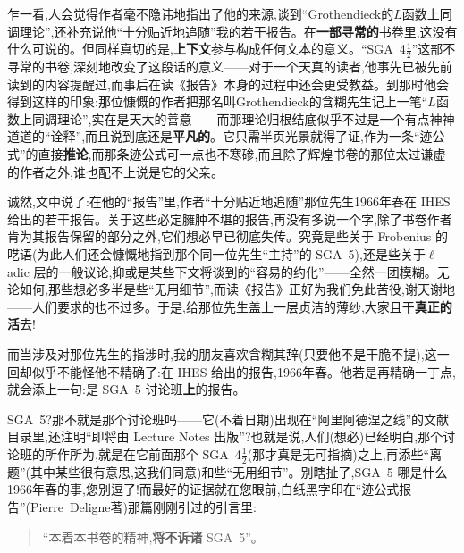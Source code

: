 乍一看,人会觉得作者毫不隐讳地指出了他的来源,谈到“Grothendieck的$L$\dmark{}函数上同调理论”,还补充说他“十分贴近地追随”我的若干报告。在\textbf{一部寻常的}书卷里,这没有什么可说的。但同样真切的是,\textbf{上下文}参与构成任何文本的意义。“SGA~4$\frac{1}{2}$”这部不寻常的书卷,深刻地改变了这段话的意义——对于一个天真的读者,他事先已被先前读到的内容提醒过,而事后在读《报告》本身的过程中还会更受教益。到那时他会得到这样的印象:那位慷慨的作者把那名叫Grothendieck的含糊先生记上一笔“$L$函数上同调理论”,实在是天大的善意——而那理论归根结底似乎不过是一个有点神神道道的“诠释”,而且说到底还是\textbf{平凡的}。它只需半页光景就得了证,作为一条“迹公式”的直接\textbf{推论},而那条迹公式可一点也不寒碜,而且除了辉煌书卷的那位太过谦虚的作者之外,谁也配不上说是它的父亲。

诚然,文中说了:在他的“报告”里,作者“十分贴近地追随”那位先生1966年春在 IHES 给出的若干报告。关于这些必定臃肿不堪的报告,再没有多说一个字,除了书卷作者肯为其报告保留的部分之外,它们想必早已彻底失传。究竟是些关于 Frobenius 的呓语(为此人们还会慷慨地指到那个同一位先生“主持”的 SGA~5),还是些关于$\ell$-adic 层的一般议论,抑或是某些下文将谈到的“容易的约化”——全然一团模糊。无论如何,那些想必多半是些“无用细节”,而读《报告》正好为我们免此苦役,谢天谢地——人们要求的也不过多。于是,给那位先生盖上一层贞洁的薄纱,大家且干\textbf{真正的活}去!

而当涉及对那位先生的指涉时,我的朋友喜欢含糊其辞(只要他不是干脆不提),这一回却似乎不能怪他不精确了:在 IHES 给出的报告,1966年春。他若是再精确一丁点,就会添上一句:是 SGA~5 讨论班\textbf{上}的报告。

SGA~5?那不就是那个讨论班吗——它(不着日期)出现在“阿里阿德涅之线”的文献目录里,还注明“即将由 Lecture Notes 出版”?也就是说,人们(想必)已经明白,那个讨论班的所作所为,就是在它前面那个 SGA~4$\frac{1}{2}$(那才真是无可指摘)之上,再添些“离题”(其中某些很有意思,这我们同意)和些“无用细节”。别瞎扯了,SGA~5 哪是什么1966年春的事,您别逗了!而最好的证据就在您眼前,\dmark{}白纸黑字印在“迹公式报告”(Pierre~Deligne著)那篇刚刚引过的引言里:

\begin{quote}
“本着本书卷的精神,\textbf{将不诉诸} SGA~5”。
\end{quote}

